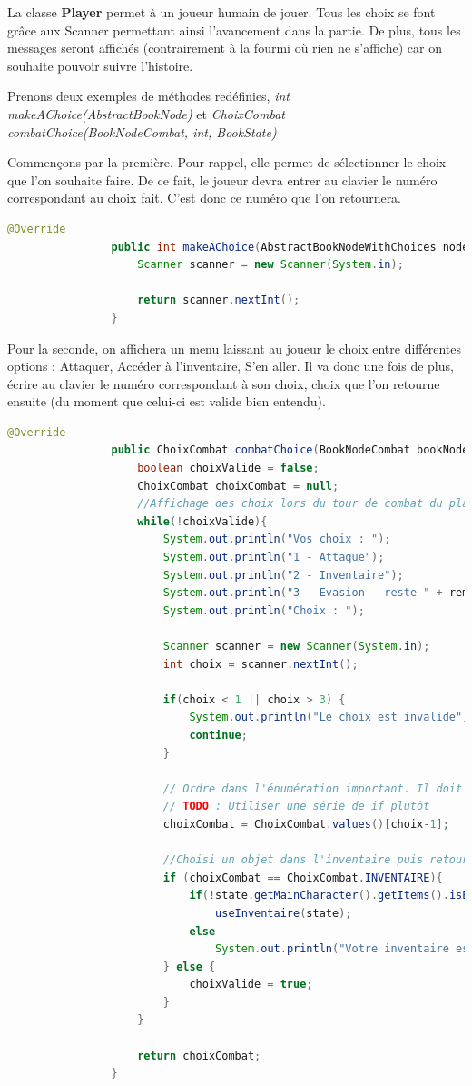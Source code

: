 			La classe \textbf{Player} permet à un joueur humain de jouer. Tous les choix se font grâce aux Scanner permettant ainsi l'avancement dans la partie. De plus, tous les messages seront affichés (contrairement à la fourmi où rien ne s'affiche) car on souhaite pouvoir suivre l'histoire.

			Prenons deux exemples de méthodes redéfinies, \textit{int makeAChoice(AbstractBookNode)} et \textit{ChoixCombat combatChoice(BookNodeCombat, int, BookState)}

			Commençons par la première. Pour rappel, elle permet de sélectionner le choix que l'on souhaite faire. De ce fait, le joueur devra entrer au clavier le numéro correspondant au choix fait. C'est donc ce numéro que l'on retournera.

			\begin{lstlisting}[gobble=16, language=java, caption=makeAChoice() de Player]
				@Override
				public int makeAChoice(AbstractBookNodeWithChoices node) {
					Scanner scanner = new Scanner(System.in);

					return scanner.nextInt();
				}
			\end{lstlisting}

			Pour la seconde, on affichera un menu laissant au joueur le choix entre différentes options : Attaquer, Accéder à l'inventaire, S'en aller. Il va donc une fois de plus, écrire au clavier le numéro correspondant à son choix, choix que l'on retourne ensuite (du moment que celui-ci est valide bien entendu).

			\begin{lstlisting}[gobble=16, language=java, caption=combatChoice() de Player]
				@Override
				public ChoixCombat combatChoice(BookNodeCombat bookNodeCombat, int remainingRoundBeforeEvasion, BookState state) {
					boolean choixValide = false;
					ChoixCombat choixCombat = null;
					//Affichage des choix lors du tour de combat du player
					while(!choixValide){
						System.out.println("Vos choix : ");
						System.out.println("1 - Attaque");
						System.out.println("2 - Inventaire");
						System.out.println("3 - Evasion - reste " + remainingRoundBeforeEvasion + " tours");
						System.out.println("Choix : ");

						Scanner scanner = new Scanner(System.in);
						int choix = scanner.nextInt();

						if(choix < 1 || choix > 3) {
							System.out.println("Le choix est invalide");
							continue;
						}

						// Ordre dans l'énumération important. Il doit être identique au menu ci-dessus.
						// TODO : Utiliser une série de if plutôt
						choixCombat = ChoixCombat.values()[choix-1];

						//Choisi un objet dans l'inventaire puis retourne au choix
						if (choixCombat == ChoixCombat.INVENTAIRE){
							if(!state.getMainCharacter().getItems().isEmpty())
								useInventaire(state);
							else
								System.out.println("Votre inventaire est vide");
						} else {
							choixValide = true;
						}
					}

					return choixCombat;
				}
			\end{lstlisting}


